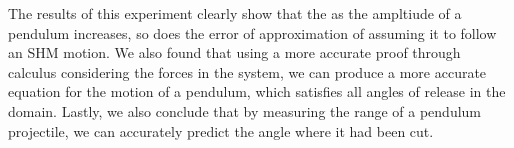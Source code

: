 The results of this experiment clearly show that the as the ampltiude of a pendulum increases, so does the error of approximation of assuming it to follow an SHM motion. We also found that using a more accurate proof through calculus considering the forces in the system, we can produce a more accurate equation for the motion of a pendulum, which satisfies all angles of release in the domain. Lastly, we also conclude that by measuring the range of a pendulum projectile, we can accurately predict the angle where it had been cut.